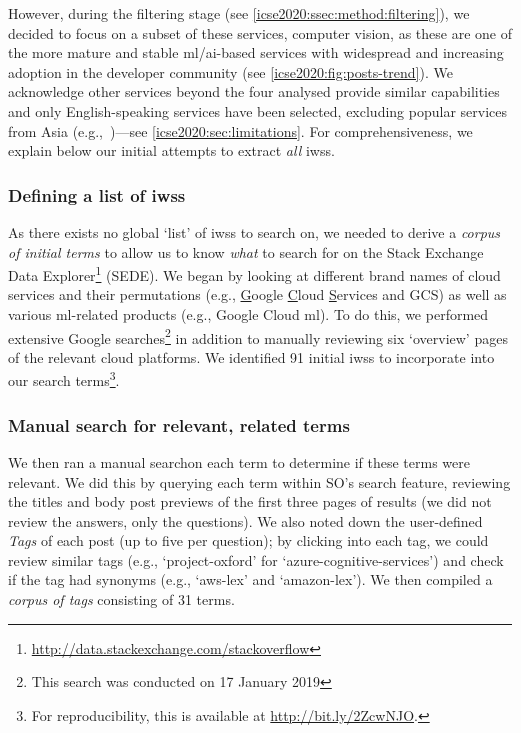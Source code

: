 However, during the filtering stage (see \cref{icse2020:ssec:method:filtering}), we decided to focus on a subset of these services, computer vision, as these are one of the more mature and stable \gls{ml}/\gls{ai}-based services with widespread and increasing adoption in the developer community (see \cref{icse2020:fig:posts-trend}). We acknowledge other services beyond the four analysed provide similar capabilities~ and only English-speaking services have been selected, excluding popular services from Asia (e.g.,~)---see \cref{icse2020:sec:limitations}. For comprehensiveness, we explain below our initial attempts to extract \textit{all} \glspl{iws}. %

\subsubsection{Defining a list of \glspl{iws}}
As there exists no global `list' of \glspl{iws} to search on, we needed to derive a \textit{corpus of initial terms} to allow us to know \textit{what} to search for on the Stack Exchange Data Explorer\footnote{\url{http://data.stackexchange.com/stackoverflow}} (SEDE). We began by looking at different brand names of cloud services and their permutations (e.g., \uline{G}oogle \uline{C}loud \uline{S}ervices and GCS) as well as various \gls{ml}-related products (e.g., Google Cloud \gls{ml}). To do this, we performed extensive Google searches\footnote{This search was conducted on 17 January 2019}\def\footnotesearchdate{2} in addition to manually reviewing six `overview' pages of the relevant cloud platforms. We identified 91 initial \glspl{iws} to incorporate into our search terms\footnote{For reproducibility, this is available at \url{http://bit.ly/2ZcwNJO}.}.\def\footnotereproducability{3}

\subsubsection{Manual search for relevant, related terms}
We then ran a manual search\footnotemark[\footnotesearchdate{}] %
on each term to determine if these terms were relevant. We did this by querying each term within SO's search feature, reviewing the titles and body post previews of the first three pages of results (we did not review the answers, only the questions). We also noted down the user-defined \textit{Tags} of each post (up to five per question); by clicking into each tag, we could review similar tags (e.g., `project-oxford' for `azure-cognitive-services') and check if the tag had synonyms (e.g., `aws-lex' and `amazon-lex'). We then compiled a \textit{corpus of tags} consisting of 31 terms.

